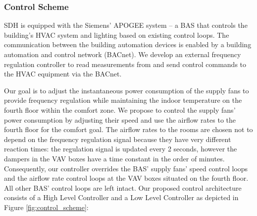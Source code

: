 
\subsubsection{Control Scheme}\label{sec:control_scheme}
SDH is equipped with the Siemens' APOGEE system -- a BAS that controls the building's HVAC system and lighting based on existing control loops. %
The communication between the building automation devices is enabled by a building automation and control network (BACnet). 
We develop an external frequency regulation controller to read measurements from and send control commands to the HVAC equipment via the BACnet. 

Our goal is to adjust the instantaneous power consumption of the supply fans to provide frequency regulation while maintaining the indoor temperature on the fourth floor within the comfort zone.
We propose to control the supply fans' power consumption by adjusting their speed and use the airflow rates to the fourth floor for the comfort goal.
The airflow rates to the rooms are chosen not to depend on the frequency regulation signal because they have very different reaction times: the regulation signal is updated every 2 seconds, however the dampers in the VAV boxes have a  time constant in the order of minutes.
Consequently, our controller overrides the BAS' supply fans' speed control loops and the airflow rate control loops at the VAV boxes situated on the fourth floor. 
All other BAS' control loops are left intact.
Our proposed control architecture consists of a High Level Controller and a Low Level Controller as depicted in Figure \ref{fig:control_scheme}:

